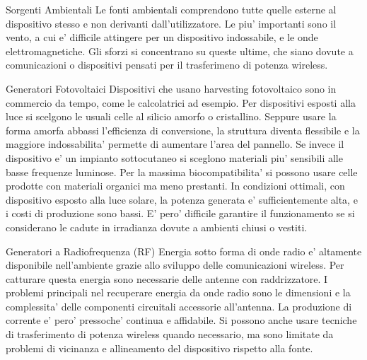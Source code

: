 \begin{section}{Sorgenti Ambientali}
    Le fonti ambientali comprendono tutte quelle esterne al dispositivo stesso e non derivanti dall'utilizzatore. Le piu' importanti sono il vento, a cui e' difficile attingere per un dispositivo indossabile, e le onde elettromagnetiche. Gli sforzi si concentrano su queste ultime, che siano dovute a comunicazioni o dispositivi pensati per il trasferimeno di potenza wireless.

    \begin{subsection}{Generatori Fotovoltaici}
    Dispositivi che usano harvesting fotovoltaico sono in commercio da tempo, come le calcolatrici ad esempio. Per dispositivi esposti alla luce si scelgono le usuali celle al silicio amorfo o cristallino. Seppure usare la forma amorfa abbassi l'efficienza di conversione, la struttura diventa flessibile e la maggiore indossabilita' permette di aumentare l'area del pannello. Se invece il dispositivo e' un impianto sottocutaneo si sceglono materiali piu' sensibili alle basse frequenze luminose. Per la massima biocompatibilita' si possono usare celle prodotte con materiali organici ma meno prestanti. In condizioni ottimali, con dispositivo esposto alla luce solare, la potenza generata e' sufficientemente alta, e i costi di produzione sono bassi. E' pero' difficile garantire il funzionamento se si considerano le cadute in irradianza dovute a ambienti chiusi o vestiti.
    \end{subsection}

    \begin{subsection}{Generatori a Radiofrequenza (RF)}
    Energia sotto forma di onde radio e' altamente disponibile nell'ambiente grazie allo sviluppo delle comunicazioni wireless. Per catturare questa energia sono necessarie delle antenne con raddrizzatore. I problemi principali nel recuperare energia da onde radio sono le dimensioni e la complessita' delle componenti circuitali accessorie all'antenna. La produzione di corrente e' pero' pressoche' continua e affidabile. Si possono anche usare tecniche di trasferimento di potenza wireless quando necessario, ma sono limitate da problemi di vicinanza e allineamento del dispositivo rispetto alla fonte. 
    \end{subsection}
\end{section}

